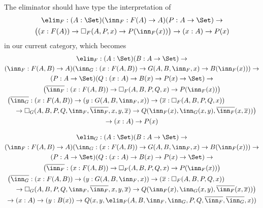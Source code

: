 \documentclass{article}
\begin{document}
The eliminator should have type the interpretation of 
\begin{multline*}
  \elim_{F} : (A : \Set)(\inn_{F} : F(A)
  \to A)(P : A \to \Set) \to \\
  \big( (x : F(A)) \to \square_{F}(A, P, x) \to P(\inn_{F}(x))\big)
  \to (x : A) \to P(x)
\end{multline*}
in our current category, which becomes
\begin{multline*}
  \elim_{F} : (A : \Set)(B : A \to \Set) \to \\
   (\inn_{F} : F(A, B) \to A)(\inn_G : (x : F(A, B)) \to G(A, B, \inn_F, x) \to B(\inn_F(x))) \to \\
(P : A \to \Set)(Q : (x : A) \to B(x) \to P(x) \to \Set) \to \\
 \big(\overline{\inn_F} : (x : F(A, B)) \to \square_{F}(A, B, P, Q, x) \to P(\inn_F(x))\big) \\
 \begin{multlined}
   \big( \overline{\inn_G} : (x : F(A, B)) \to (y : G(A, B, \inn_F, x)) \to
   (\overline{x} : \square_F(A, B, P, Q, x)) \\ \to
   \square_{G}(A, B, P, Q, \inn_F, \overline{\inn_F}, x, y,
   \overline{x}) \to Q(\inn_F(x), \inn_{G}(x, y), \overline{\inn_F}(x, \overline{x}))\big)
 \end{multlined} \\
  \to (x : A) \to P(x)
\end{multline*}

\begin{multline*}
  \elim_{G} : (A : \Set)(B : A \to \Set) \to \\
   (\inn_{F} : F(A, B) \to A)(\inn_G : (x : F(A, B)) \to G(A, B, \inn_F, x) \to B(\inn_F(x))) \to \\
(P : A \to \Set)(Q : (x : A) \to B(x) \to P(x) \to \Set) \to \\
 \big(\overline{\inn_F} : (x : F(A, B)) \to \square_{F}(A, B, P, Q, x) \to P(\inn_F(x))\big) \\
 \begin{multlined}
   \big( \overline{\inn_G} : (x : F(A, B)) \to (y : G(A, B, \inn_F, x)) \to
   (\overline{x} : \square_F(A, B, P, Q, x)) \\ \to
   \square_{G}(A, B, P, Q, \inn_F, \overline{\inn_F}, x, y,
   \overline{x}) \to Q(\inn_F(x), \inn_{G}(x, y), \overline{\inn_F}(x, \overline{x}))\big)
 \end{multlined} \\
  \to (x : A) \to (y : B(x)) \to Q(x, y, \elim_F(A, B, \inn_F, \inn_G, P, Q, \overline{\inn_F}, \overline{\inn_G}, x))
\end{multline*}
\end{document}
